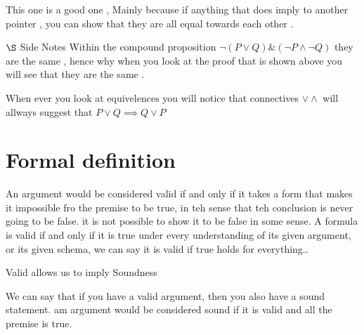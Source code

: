 \documentclass{article}
\theoremstyle{mytheoremstyle}
\theoremstyle{mytheoremstyle}
\theoremstyle{myproblemstyle}
\begin{document}
This one is a good one , Mainly because if anything that does imply to another pointer , you can show that they are all equal towards each other .



\item $\S$ Side Notes
    Within the compound proposition $\neg(P \lor Q) \&  (\neg P \land \neg Q) $ they are the same , hence why when you look at the proof that is shown above you will see that they are the same .

When ever you look at equivelences you will notice that connectives $ \lor \land $ will allways suggest that $ P \lor Q \implies Q \lor P $

\newpage

\section{Formal definition }

\begin{definition}[Valid]
    An argument would be considered valid if and only if it takes a form that makes it impossible fro the premise to be true, in teh sense that teh conclusion is never going to be false. it is not possible to show it to be false in some sense.
        A formula is valid if and only if it is true under every understanding of its given argument, or its given schema, we can say it is valid if true holds for everything..
\end{definition}

\begin{definition}
    Valid allows us to imply Soundness

    We can say that if you have a valid argument, then you also have a sound statement.
    am argument would be considered sound if it is valid and all the premise is true.
\end{definition}
\end{document}
